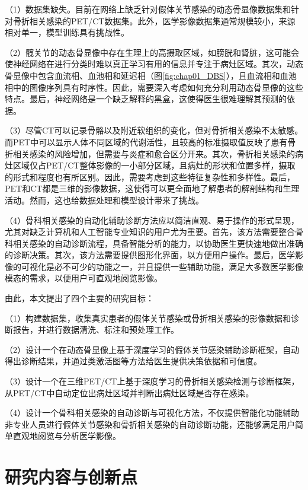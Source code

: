 （1）数据集缺失。目前在网络上缺乏针对假体关节感染的动态骨显像数据集和针对骨折相关感染的PET/CT数据集。此外，医学影像数据集通常规模较小，来源相对单一，模型训练具有挑战性。

（2）髋关节的动态骨显像中存在生理上的高摄取区域，如膀胱和肾脏，这可能会使神经网络在进行分类时难以真正学习有用的信息并专注于病灶区域。其次，动态骨显像中包含血流相、血池相和延迟相（图\ref{fig:chap01_DBS}），且血流相和血池相中的图像序列具有时序性。因此，需要深入考虑如何充分利用动态骨显像的这些特点。最后，神经网络是一个缺乏解释的黑盒，这使得医生很难理解其预测的依据。

（3）尽管CT可以记录骨骼以及附近软组织的变化，但对骨折相关感染不太敏感。而PET中可以显示人体不同区域的代谢活性，且较高的标准摄取值反映了患有骨折相关感染的风险增加，但需要与炎症和愈合区分开来。其次，骨折相关感染的病灶区域仅占PET/CT整体影像的一小部分区域，且病灶的形状和位置多样，摄取的形式和程度也有所区别。因此，需要考虑到这些特征复杂性和多样性。最后，PET和CT都是三维的影像数据，这使得可以更全面地了解患者的解剖结构和生理活动。然而，这也给数据处理和模型设计带来了挑战。

（4）骨科相关感染的自动化辅助诊断方法应以简洁直观、易于操作的形式呈现，尤其对缺乏计算机和人工智能专业知识的用户尤为重要。首先，该方法需要整合骨科相关感染的自动诊断流程，具备智能分析的能力，以协助医生更快速地做出准确的诊断决策。其次，该方法需要提供图形化界面，以方便用户操作。最后，医学影像的可视化是必不可少的功能之一，并且提供一些辅助功能，满足大多数医学影像模态的需求，以便用户可直观地阅览影像。

由此，本文提出了四个主要的研究目标：

（1）构建数据集，收集真实患者的假体关节感染或骨折相关感染的影像数据和诊断报告，并进行数据清洗、标注和预处理工作。

（2）设计一个在动态骨显像上基于深度学习的假体关节感染辅助诊断框架，自动得出诊断结果，并通过类激活图等方法给医生提供决策依据和可信度。

（3）设计一个在三维PET/CT上基于深度学习的骨折相关感染检测与诊断框架，从PET/CT中自动定位出病灶区域并判断出病灶区域是否存在感染。

（4）设计一个骨科相关感染的自动诊断与可视化方法，不仅提供智能化功能辅助非专业人员进行假体关节感染和骨折相关感染的自动诊断功能，还能够满足用户简单直观地阅览与分析医学影像。

\section{研究内容与创新点}

